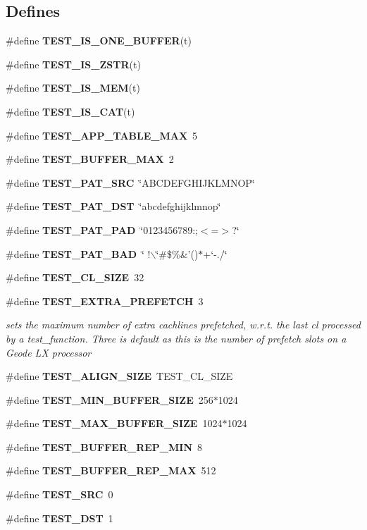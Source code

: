 \subsection*{Defines}
\begin{CompactItemize}
\item 
\#define {\bf TEST\_\-IS\_\-ONE\_\-BUFFER}(t)
\item 
\#define {\bf TEST\_\-IS\_\-ZSTR}(t)
\item 
\#define {\bf TEST\_\-IS\_\-MEM}(t)
\item 
\#define {\bf TEST\_\-IS\_\-CAT}(t)
\item 
\#define {\bf TEST\_\-APP\_\-TABLE\_\-MAX}\ 5
\item 
\#define {\bf TEST\_\-BUFFER\_\-MAX}\ 2
\item 
\#define {\bf TEST\_\-PAT\_\-SRC}\ \char`\"{}ABCDEFGHIJKLMNOP\char`\"{}
\item 
\#define {\bf TEST\_\-PAT\_\-DST}\ \char`\"{}abcdefghijklmnop\char`\"{}
\item 
\#define {\bf TEST\_\-PAT\_\-PAD}\ \char`\"{}0123456789:;$<$=$>$?\char`\"{}
\item 
\#define {\bf TEST\_\-PAT\_\-BAD}\ \char`\"{} !$\backslash$\char`\"{}\#\$\%\&'()$\ast$+`-./\char`\"{}
\item 
\#define {\bf TEST\_\-CL\_\-SIZE}\ 32
\item 
\#define {\bf TEST\_\-EXTRA\_\-PREFETCH}\ 3
\begin{CompactList}\small\item\em sets the maximum number of extra cachlines prefetched, w.r.t. the last cl processed by a test\_\-function. Three is default as this is the number of prefetch slots on a Geode LX processor\item\end{CompactList}\item 
\#define {\bf TEST\_\-ALIGN\_\-SIZE}\ TEST\_\-CL\_\-SIZE
\item 
\#define {\bf TEST\_\-MIN\_\-BUFFER\_\-SIZE}\ 256$\ast$1024
\item 
\#define {\bf TEST\_\-MAX\_\-BUFFER\_\-SIZE}\ 1024$\ast$1024
\item 
\#define {\bf TEST\_\-BUFFER\_\-REP\_\-MIN}\ 8
\item 
\#define {\bf TEST\_\-BUFFER\_\-REP\_\-MAX}\ 512
\item 
\#define {\bf TEST\_\-SRC}\ 0
\item 
\#define {\bf TEST\_\-DST}\ 1
\end{CompactItemize}
